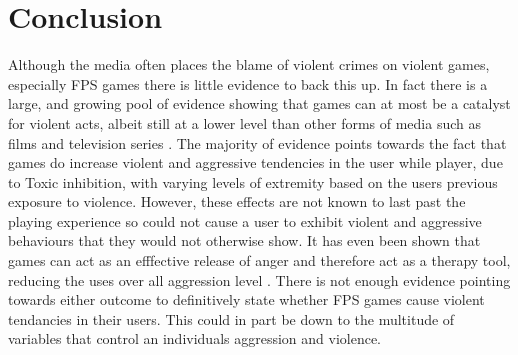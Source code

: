 \documentclass{scrartcl}
\begin{document}
\section{Conclusion}
Although the media often places the blame of violent crimes on violent games, especially FPS games there is little evidence to back this up. In fact there is a large, and growing pool of evidence showing that games can at most be a catalyst for violent acts, albeit still at a lower level than other forms of media such as films and television series \cite{rawn2008examining}. The majority of evidence points towards the fact that games do increase violent and aggressive tendencies in the user while player, due to Toxic inhibition, with varying levels of extremity based on the users previous exposure to violence. However, these effects are not known to last past the playing experience so could not cause a user to exhibit violent and aggressive behaviours that they would not otherwise show. It has even been shown that games can act as an efffective release of anger and therefore act as a therapy tool, reducing the uses over all aggression level \cite {lee2016role}. There is not enough evidence pointing towards either outcome to definitively state whether FPS games cause violent tendancies in their users. This could in part be down to the multitude of variables that control an individuals aggression and violence. 




\end{document}
